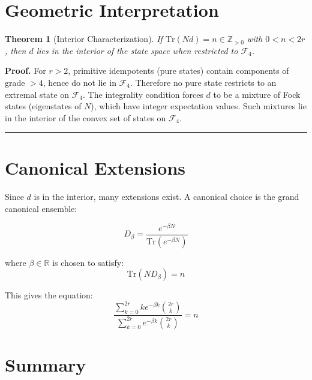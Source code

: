 \documentclass[aps,preprint]{revtex4}
\newtheorem{theorem}{Theorem}
\newenvironment{proof}[1][Proof]{\noindent\textbf{#1.} }{\ \rule{0.5em}{0.5em}}
\begin{document}
\section{Geometric Interpretation}

\begin{theorem}[Interior Characterization]
If $\mathrm{Tr}(Nd)=n\in \mathbb{Z}_{>0}$ with $0<n<2r$, then $d$ lies in
the interior of the state space when restricted to $\mathcal{F}_{4}$.
\end{theorem}

\begin{proof}
For $r>2$, primitive idempotents (pure states) contain components of grade $%
>4$, hence do not lie in $\mathcal{F}_{4}$. Therefore no pure state
restricts to an extremal state on $\mathcal{F}_{4}$. The integrality
condition forces $d$ to be a mixture of Fock states (eigenstates of $N$),
which have integer expectation values. Such mixtures lie in the interior of
the convex set of states on $\mathcal{F}_{4}$.
\end{proof}

\section{Canonical Extensions}

Since $d$ is in the interior, many extensions exist. A canonical choice is
the grand canonical ensemble:

\begin{equation}
D_\beta = \frac{e^{-\beta N}}{\mathrm{Tr}(e^{-\beta N})}
\end{equation}

where $\beta \in \mathbb{R}$ is chosen to satisfy: 
\begin{equation}
\mathrm{Tr}(N D_\beta) = n
\end{equation}

This gives the equation: 
\begin{equation}
\frac{\sum_{k=0}^{2r} k e^{-\beta k} \binom{2r}{k}}{\sum_{k=0}^{2r}
e^{-\beta k} \binom{2r}{k}} = n
\end{equation}

\section{Summary}
\end{document}
